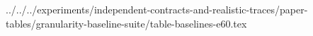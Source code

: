 ../../../experiments/independent-contracts-and-realistic-traces/paper-tables/granularity-baseline-suite/table-baselines-e60.tex